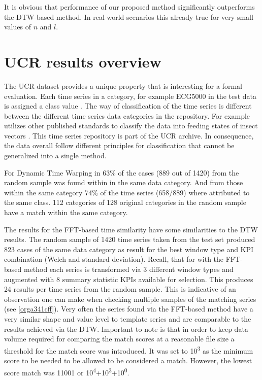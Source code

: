 \documentclass[phd,black, hidelinks]{PrincetonThesis}
\begin{document}
It is obvious that performance of our proposed method significantly outperforms the DTW-based method. In real-world scenarios this already true for very small values of \(n\) and \(l\).

\section{UCR results overview}
\label{sec:org1665f87}
\label{org6276c12}
The UCR dataset provides a unique property that is interesting for a formal evaluation. Each time series in a category, for example ECG5000 in the test data is assigned a class value \cite{hoang2019}. The way of classification of the time series is different between the different time series data categories in the repository. For example \citeauthor{willet2016} utilizes other published standards to classify the data into feeding states of insect vectors \cite{willet2016}. This time series repository is part of the UCR archive. In consequence, the data overall follow different principles for classification that cannot be generalized into a single method.

For Dynamic Time Warping in 63\% of the cases (889 out of 1420) from the random sample was found within in the same data category. And from those within the same category  74\% of the time series (658/889) where attributed to the same class. 112 categories of 128 original categories in the random sample have a match within the same category.

The results for the FFT-based time similarity have some similarities to the DTW results. The random sample of 1420 time series taken from the test set produced 823 cases of the same data category as result for the best window type and KPI combination (Welch and standard deviation). Recall, that for with the FFT-based method each series is transformed via 3 different window types and augmented with 8 summary statistic KPIs available for selection. This produces 24 results per time series from the random sample. This is indicative of an observation one can make when checking multiple samples of the matching series (see \ref{orga341cff}). Very often the series found via the FFT-based method have a very similar shape and value level to template series and are comparable to the results achieved via the DTW. Important to note is that in order to keep data volume required for comparing the match scores at a reasonable file size a threshold for the match score was introduced. It was set to 10\textsuperscript{3} as the minimum score to be needed to be allowed to be considered a match. However, the lowest score match was 11001 or 10\textsuperscript{4}+10\textsuperscript{3}+10\textsuperscript{0}.
\end{document}
